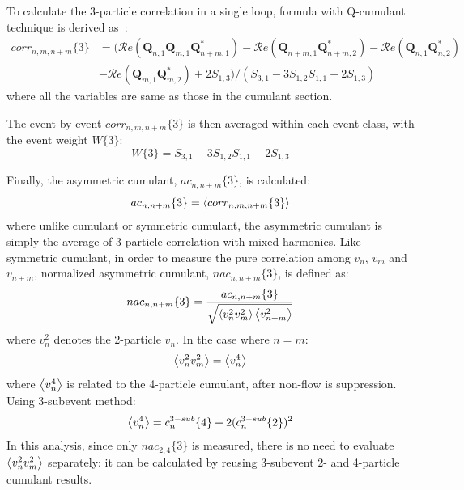 To calculate the 3-particle correlation in a single loop, formula with Q-cumulant technique is derived as~\cite{Jia:2017hbm}:
\begin{equation}
\begin{split}
corr_{n,m,n+m}\{3\} &= ( \mathcal{R}\textit{e}(\pmb{Q}_{n,1}\pmb{Q}_{m,1}\pmb{Q}_{n+m,1}^*)-\mathcal{R}\textit{e}(\pmb{Q}_{n+m,1}\pmb{Q}_{n+m,2}^*)-\mathcal{R}\textit{e}(\pmb{Q}_{n,1}\pmb{Q}_{n,2}^*) \\
&-\mathcal{R}\textit{e}(\pmb{Q}_{m,1}\pmb{Q}_{m,2}^*)+2S_{1,3} ) / (S_{3,1}-3S_{1,2}S_{1,1}+2S_{1,3})
\end{split}
\end{equation}
where all the variables are same as those in the cumulant section.

The event-by-event $corr_{n,m,n+m}\{3\}$ is then averaged within each event class, with the event weight $W\{3\}$:
\begin{equation}
W\{3\} = S_{3,1}-3S_{1,2}S_{1,1}+2S_{1,3}
\end{equation}

Finally, the asymmetric cumulant, $ac_{n,n+m}\{3\}$, is calculated:
\begin{equation}
ac_{n,n+m}\{3\} = \left\langle corr_{n,m,n+m}\{3\}\right\rangle
\end{equation}
where unlike cumulant or symmetric cumulant, the asymmetric cumulant is simply the average of 3-particle correlation with mixed harmonics. Like symmetric cumulant, in order to measure the pure correlation among $v_n$, $v_m$ and $v_{n+m}$, normalized asymmetric cumulant, $nac_{n,n+m}\{3\}$, is defined as:
\begin{equation}
nac_{n,n+m}\{3\} = \frac{ac_{n,n+m}\{3\}}{\sqrt{\left\langle v_n^2 v_m^2\right\rangle\left\langle v_{n+m}^2\right\rangle}}
\end{equation}
where $v_n^2$ denotes the 2-particle $v_n$. In the case where $n=m$:
\begin{equation}
\left\langle v_n^2 v_m^2\right\rangle = \left\langle v_n^4\right\rangle
\end{equation}
where $\left\langle v_n^4\right\rangle$ is related to the 4-particle cumulant, after non-flow is suppression. Using 3-subevent method:
\begin{equation}
\left\langle v_n^4\right\rangle = c_n^{3-sub}\{4\} + 2 (c_n^{3-sub}\{2\})^2
\end{equation}
In this analysis, since only $nac_{2,4}\{3\}$ is measured, there is no need to evaluate $\left\langle v_n^2 v_m^2\right\rangle$ separately: it can be calculated by reusing 3-subevent 2- and 4-particle cumulant results.



